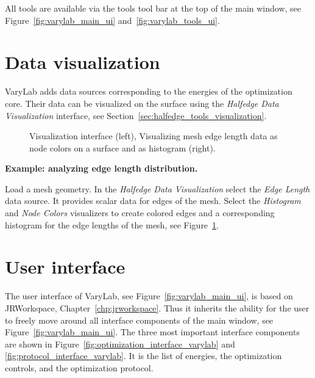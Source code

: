 \documentclass[Thesis.tex]{subfiles}
\begin{document}
All tools are available via the tools tool bar at the top of the main window, see Figure~\ref{fig:varylab_main_ui} and~\ref{fig:varylab_tools_ui}.

\section{Data visualization}

{\sc VaryLab} adds data sources corresponding to the energies of the optimization core. Their data can be visualized on the surface using the \emph{Halfedge Data Visualization} interface, see Section~\ref{sec:halfedge_tools_visualization}. 

\begin{figure}
    \begin{center}
    \caption{Visualization interface (left), Visualizing mesh edge length data as node colors on a surface and as histogram (right).}
    \label{fig:visualizing_edge_lengths}
    \end{center}
\end{figure}

{\bf Example: analyzing edge length distribution.}
\nopagebreak

Load a mesh geometry. In the \emph{Halfedge Data Visualization} select the \emph{Edge Length} data source. It provides scalar data for edges of the mesh. Select the \emph{Histogram} and \emph{Node Colors} visualizers to create colored edges and a corresponding histogram for the edge lengths of the mesh, see Figure~\ref{fig:visualizing_edge_lengths}.


\section{User interface}
\label{sec:ui_varylab}

The user interface of {\sc VaryLab}, see Figure~\ref{fig:varylab_main_ui}, is based on {\sc JRWorkspace}, Chapter~\ref{chp:jrworkspace}. Thus it inherits the ability for the user to freely move around all interface components of the main window, see Figure~\ref{fig:varylab_main_ui}. 
The three most important interface components are shown in Figure~\ref{fig:optimization_interface_varylab} and \ref{fig:protocol_interface_varylab}. It is the list of energies, the optimization controls, and the optimization protocol.
\end{document}
